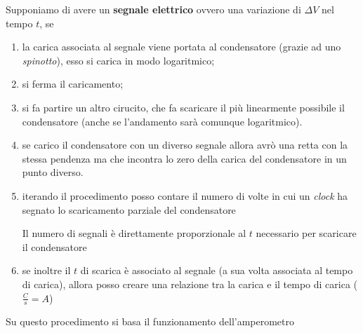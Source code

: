 \documentclass{article}
\begin{document}
Supponiamo di avere un \textbf{segnale elettrico} ovvero una variazione di $\Delta V$ nel tempo $t$, se
\begin{enumerate}
  \item la carica associata al segnale viene portata al condensatore (grazie ad uno \textit{spinotto}), esso si carica in modo logaritmico;
  \item  si ferma il caricamento;
  \item  si fa partire un altro cirucito, che fa scaricare il più linearmente possibile il condensatore (anche se l'andamento sarà comunque logaritmico).
  \item se carico il condensatore con un diverso segnale allora avrò una retta con la stessa pendenza ma che incontra lo zero della carica del condensatore in un punto diverso.
  \item iterando il procedimento posso contare il numero di volte in cui un \textit{clock} ha segnato lo scaricamento parziale del condensatore
  
  Il numero di segnali è direttamente proporzionale al $t$ necessario per scaricare il condensatore
  \item se inoltre il $t$ di scarica è associato al segnale (a sua volta associata al tempo di carica), allora posso creare una relazione tra la carica e il tempo di carica ($\frac{C}{s}=A$)
\end{enumerate}
Su questo procedimento si basa il funzionamento dell'amperometro
\end{document}
